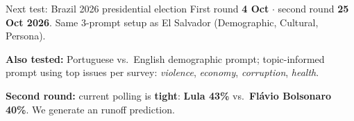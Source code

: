 \documentclass[aspectratio=169,11pt]{beamer}
\begin{document}
	\begin{frame}{Next test: Brazil 2026 presidential election}
		First round \textbf{4 Oct} $\cdot$ second round \textbf{25 Oct 2026}.
		Same 3-prompt setup as El Salvador (Demographic, Cultural, Persona).
		\vspace{0.4em}
		
		\textbf{Also tested:} Portuguese vs.\ English demographic
		prompt; topic-informed prompt using top issues per survey\footnotemark:
		\emph{violence}, \emph{economy}, \emph{corruption}, \emph{health}.
		\vspace{0.4em}
		
		\textbf{Second round:} current polling is \textbf{tight}:
		\textbf{Lula 43\%} vs.\ \textbf{Flávio Bolsonaro 40\%}. We generate an runoff prediction.
	\end{frame}
	
\end{document}
